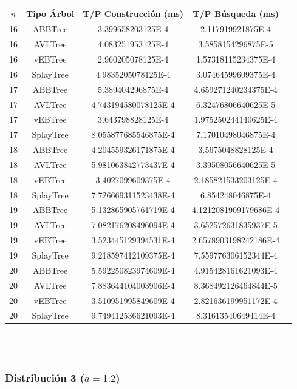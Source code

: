 \documentclass[letterpaper,12pt]{article}
\begin{document}
\begin{tabular}{|c|c|c|c|c|}
\hline
\textbf{$n$} & \textbf{Tipo Árbol} & \textbf{T/P Construcción (ms)} & \textbf{T/P Búsqueda (ms)} \\
\hline
16 & ABBTree & 3.399658203125E-4 & 2.117919921875E-4 \\
\hline
16 & AVLTree & 4.083251953125E-4  & 3.5858154296875E-5 \\
\hline
16 & vEBTree & 2.960205078125E-4  & 1.57318115234375E-4 \\
\hline
16 & SplayTree & 4.9835205078125E-4 & 3.07464599609375E-4 \\
\hline
\hline
17 & ABBTree & 5.389404296875E-4  & 4.659271240234375E-4 \\
\hline
17 & AVLTree & 4.743194580078125E-4 & 6.32476806640625E-5 \\
\hline
17 & vEBTree & 3.643798828125E-4  & 1.975250244140625E-4\\
\hline
17 & SplayTree & 8.055877685546875E-4 & 7.17010498046875E-4 \\
\hline
\hline
18 & ABBTree & 4.204559326171875E-4 & 3.5675048828125E-4 \\
\hline
18 & AVLTree & 5.981063842773437E-4 & 3.39508056640625E-5 \\
\hline
18 & vEBTree & 3.4027099609375E-4 & 2.185821533203125E-4 \\
\hline
18 & SplayTree & 7.726669311523438E-4  & 6.854248046875E-4 \\
\hline
\hline
19 & ABBTree & 5.132865905761719E-4 & 4.1212081909179686E-4 \\
\hline
19 & AVLTree & 7.082176208496094E-4  & 3.652572631835937E-5 \\
\hline
19 & vEBTree & 3.523445129394531E-4 & 2.6578903198242186E-4\\
\hline
19 & SplayTree & 9.218597412109375E-4 & 7.559776306152344E-4 \\
\hline
\hline
20 & ABBTree & 5.592250823974609E-4 & 4.915428161621093E-4 \\
\hline
20 & AVLTree & 7.883644104003906E-4 & 8.368492126464844E-5 \\
\hline
20 & vEBTree & 3.510951995849609E-4 & 2.821636199951172E-4\\
\hline
20 & SplayTree & 9.749412536621093E-4 & 8.31613540649414E-4 \\
\hline
\end{tabular}
\\ \\

\subsubsection{Distribución 3 ($a=1.2$)}
\end{document}
